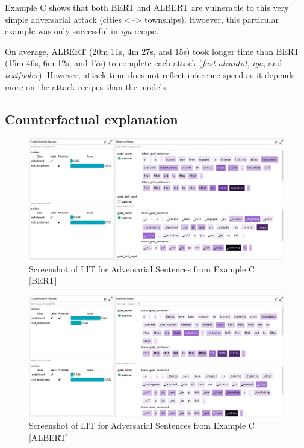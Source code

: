 \documentclass{article}
\begin{document}
Example C shows that both BERT and ALBERT are vulnerable to this very simple adversarial attack (cities <--> townships). Hwoever, this particular example was only successful in \emph{iga} recipe. 

On average, ALBERT (20m 11s, 4m 27s, and 15s) took longer time than BERT (15m 46s, 6m 12s, and 17s) to complete each attack (\emph{fast-alzantot}, \emph{iga}, and \emph{textfooler}). However, attack time does not reflect inference speed as it depends more on the attack recipes than the models.

\subsection{Counterfactual explanation}

\begin{figure}[!htbp]
    \centering
    \includegraphics[width=\textwidth]{lit-rte-example-c-adversarial-a}
    \caption{Screenshot of LIT \cite{Tenney2020TheLI} for Adversarial Sentences from Example C [BERT]}
    \label{fig:lit-rte-example-c-adversarial-a}
\end{figure}

\begin{figure}[!htbp]
    \centering
    \includegraphics[width=\textwidth]{lit-rte-example-c-adversarial-b}
    \caption{Screenshot of LIT \cite{Tenney2020TheLI} for Adversarial Sentences from Example C [ALBERT]}
    \label{fig:lit-rte-example-c-adversarial-b}
\end{figure}
\end{document}
